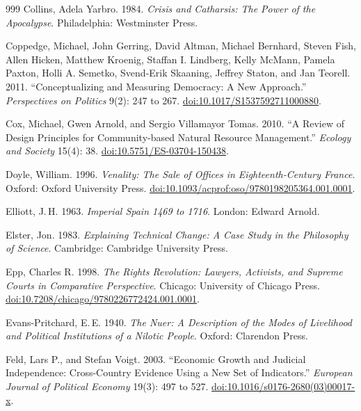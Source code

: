 \documentclass[11pt,letterpaper]{article}
\theoremstyle{definition}
\theoremstyle{remark}
\begin{document}
\begin{thebibliography}{999}
Collins, Adela Yarbro. 1984. \emph{Crisis and Catharsis: The Power of the Apocalypse}. Philadelphia: Westminster Press.

Coppedge, Michael, John Gerring, David Altman, Michael Bernhard, Steven Fish, Allen Hicken, Matthew Kroenig, Staffan I. Lindberg, Kelly McMann, Pamela Paxton, Holli A. Semetko, Svend-Erik Skaaning, Jeffrey Staton, and Jan Teorell. 2011. ``Conceptualizing and Measuring Democracy: A New Approach.'' \emph{Perspectives on Politics} 9(2): 247 to 267. \href{https://doi.org/10.1017/S1537592711000880}{doi:10.1017/S1537592711000880}.

Cox, Michael, Gwen Arnold, and Sergio Villamayor Tomas. 2010. ``A Review of Design Principles for Community-based Natural Resource Management.'' \emph{Ecology and Society} 15(4): 38. \href{https://doi.org/10.5751/ES-03704-150438}{doi:10.5751/ES-03704-150438}.

Doyle, William. 1996. \emph{Venality: The Sale of Offices in Eighteenth-Century France}. Oxford: Oxford University Press. \href{https://doi.org/10.1093/acprof:oso/9780198205364.001.0001}{doi:10.1093/acprof:oso/9780198205364.001.0001}.

Elliott, J.\,H. 1963. \emph{Imperial Spain 1469 to 1716}. London: Edward Arnold.

Elster, Jon. 1983. \emph{Explaining Technical Change: A Case Study in the Philosophy of Science}. Cambridge: Cambridge University Press.

Epp, Charles R. 1998. \emph{The Rights Revolution: Lawyers, Activists, and Supreme Courts in Comparative Perspective}. Chicago: University of Chicago Press. \href{https://doi.org/10.7208/chicago/9780226772424.001.0001}{doi:10.7208/chicago/9780226772424.001.0001}.

Evans-Pritchard, E.\,E. 1940. \emph{The Nuer: A Description of the Modes of Livelihood and Political Institutions of a Nilotic People}. Oxford: Clarendon Press.

Feld, Lars P., and Stefan Voigt. 2003. ``Economic Growth and Judicial Independence: Cross-Country Evidence Using a New Set of Indicators.'' \emph{European Journal of Political Economy} 19(3): 497 to 527. \href{https://doi.org/10.1016/s0176-2680(03)00017-x}{doi:10.1016/s0176-2680(03)00017-x}.


\end{thebibliography}
\end{document}
